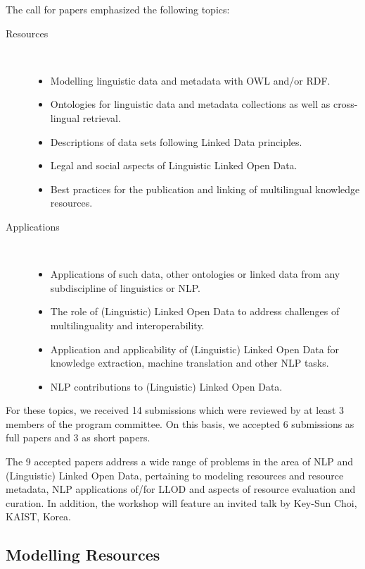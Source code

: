 The call for papers emphasized the following topics:

\begin{description}
\item[Resources] \hspace{0.5cm}\\
	\begin{itemize}
	\item Modelling linguistic data and metadata with OWL and/or RDF.
    \item Ontologies for linguistic data and metadata collections as well as cross-lingual retrieval.
    \item Descriptions of data sets following Linked Data principles.
    \item Legal and social aspects of Linguistic Linked Open Data.
    \item Best practices for the publication and linking of multilingual knowledge resources.
	\end{itemize}
\item[Applications] \hspace{0.5cm}\\
	\begin{itemize}
	\item Applications of such data, other ontologies or linked data from any subdiscipline of linguistics or NLP.
    \item The role of (Linguistic) Linked Open Data to address challenges of multilinguality and interoperability.
    \item Application and applicability of (Linguistic) Linked Open Data for knowledge extraction, machine translation and other NLP tasks.
    \item NLP contributions to (Linguistic) Linked Open Data.
	\end{itemize}
\end{description}

\noindent 
For these topics, we received 14 submissions which were reviewed by at least 3 members of the program committee. 
On this basis, we accepted 6 submissions as full papers and 3 as short papers.

The 9 accepted papers address a wide range of problems in the area of NLP and (Linguistic) Linked Open Data, pertaining to modeling resources and resource metadata, NLP applications of/for LLOD and aspects of resource evaluation and curation. In addition, the workshop will feature an invited talk by Key-Sun Choi, KAIST, Korea.

\subsection{Modelling Resources}

